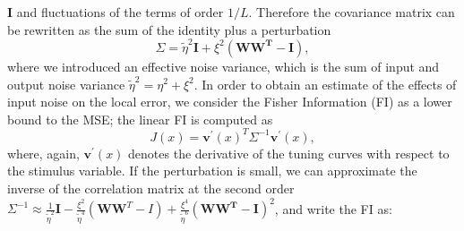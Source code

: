 \documentclass[a4paper]{article}%
\begin{document}
$\mathbf{I}$ and fluctuations of the terms of order $1/L$. Therefore
the covariance matrix can be rewritten as the sum of the identity plus a
perturbation
\begin{equation}
\Sigma= \tilde\eta^{2} \mathbf{I} + \xi^{2}(\mathbf{WW^{T} -I}),
\end{equation}
where we introduced an effective noise variance, which is the sum of input and output
noise variance $\tilde\eta^{2} = \eta^{2} + \xi^{2} $. In order to obtain an
estimate of the effects of input noise on the local error, we consider the Fisher Information (FI)
as a lower bound to the MSE; the linear FI is computed as
\begin{equation}
J(x) = \mathbf{v^{\prime}}(x)^{T} \Sigma^{-1}\mathbf{v^{\prime}}(x),
\end{equation}
where, again, $\mathbf{v^{\prime}}(x)$ denotes the derivative of the tuning
curves with respect to the stimulus variable. If the perturbation is small, we
can approximate the inverse of the correlation matrix at the second order
\newline
$\Sigma^{-1} \approx\frac{1}{\tilde\eta^{2}} \mathbf{I} - \frac
{\xi^{2}}{\tilde\eta^{4}} \left(\mathbf{W}\mathbf{W}^{T}-I\right) + \frac{\xi^{4}}
{\tilde\eta^{6}}\left(\mathbf{WW^{T}}-\mathbf{I}\right)^{2} $, and write the  FI as:
\end{document}
